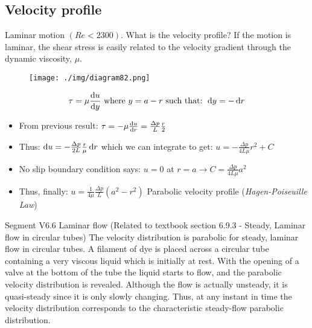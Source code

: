 \subsection{Velocity profile}
Laminar motion $\left(Re < 2300\right)$. What is the velocity profile? If the motion is laminar, the shear stress is easily related to the velocity gradient through the dynamic viscosity, $\mu$.
\begin{figure}[H]
  \centering
  \texttt{[image: ./img/diagram82.png]}
  \caption{}
\end{figure}
\begin{equation}
  \tau = \mu \frac{\dif u}{\dif y} \textrm{ where } y = a-r \textrm{ such that: } \dif y = -\dif r
\end{equation}
\begin{itemize}
  \item From previous result: $\tau = - \mu \frac{\dif u}{\dif r} = \frac{\Delta p}{L} \frac{r}{2}$
  \item Thus: $\dif u = - \frac{\Delta p}{2L} \frac{r}{\mu} \dif r$ which we can integrate to get: $u = - \frac{\Delta p}{4L\mu} r^2 + C$
  \item No slip boundary condition says: $u = 0$ at $ r = a \rightarrow C = \frac{\Delta p}{4 L \mu} a^2$
  \item Thus, finally: $u = \frac{1}{4\mu} \frac{\Delta p}{L} \left(a^2 - r^2\right)$ Parabolic velocity profile (\textit{Hagen-Poiseuille Law})
\end{itemize}
Segment V6.6 Laminar flow (Related to textbook section 6.9.3 - Steady, Laminar flow in circular tubes) The velocity distribution is parabolic for steady, laminar flow in circular tubes. A filament of dye is placed across a circular tube containing a very viscous liquid which is initially at rest. With the opening of a valve at the bottom of the tube the liquid starts to flow, and the parabolic velocity distribution is revealed. Although the flow is actually unsteady, it is quasi-steady since it is only slowly changing. Thus, at any instant in time the velocity distribution corresponds to the characteristic steady-flow parabolic distribution.
